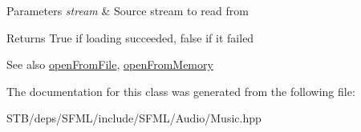 \begin{DoxyParams}{Parameters}
{\em stream} & Source stream to read from\\
\hline
\end{DoxyParams}
\begin{DoxyReturn}{Returns}
True if loading succeeded, false if it failed
\end{DoxyReturn}
\begin{DoxySeeAlso}{See also}
\hyperlink{classsf_1_1_music_a3edc66e5f5b3f11e84b90eaec9c7d7c0}{open\+From\+File}, \hyperlink{classsf_1_1_music_ae93b21bcf28ff0b5fec458039111386e}{open\+From\+Memory} 
\end{DoxySeeAlso}


The documentation for this class was generated from the following file\+:\begin{DoxyCompactItemize}
\item 
S\+T\+B/deps/\+S\+F\+M\+L/include/\+S\+F\+M\+L/\+Audio/Music.\+hpp\end{DoxyCompactItemize}
